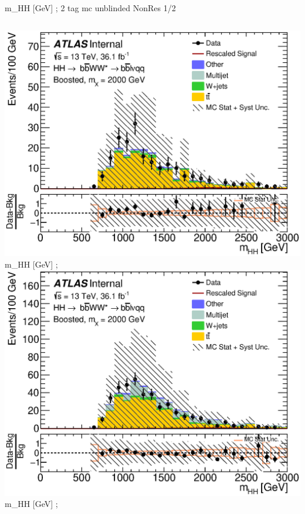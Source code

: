 \begin{frame}{m\_{HH} [GeV]  ; 2 tag mc unblinded NonRes 1/2}
\begin{columns}[c]
    \centering\includegraphics[width=\textwidth]{C_2tag_mbbcrHigh_muon_presel_met50_hhMassRebin1}\\
    m\_{HH} [GeV]  ; 
    \centering\includegraphics[width=\textwidth]{C_2tag_mbbcrHigh_lepton_presel_met50_hhMassRebin1}\\
    m\_{HH} [GeV]  ; 
  \end{columns}
  \begin{columns}[c]

\end{columns}
\end{frame}
